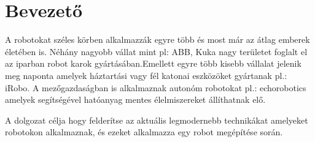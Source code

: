 \chapter{Bevezető}
A robotokat széles körben alkalmazzák egyre több és most már az átlag emberek életében is. Néhány nagyobb vállat mint pl: ABB, Kuka nagy területet foglalt el az iparban robot karok gyártásában.Emellett egyre több kisebb vállalat jelenik meg naponta amelyek háztartási vagy fél katonai eszközöket gyártanak pl.: iRobo. A mezőgazdaságban is alkalmaznak autonóm robotokat pl.: echorobotics amelyek segítségével hatóanyag mentes élelmiszereket állíthatnak elő.

A dolgozat célja hogy felderítse az aktuális legmodernebb technikákat amelyeket robotokon alkalmaznak, és ezeket alkalmazza egy robot megépítése során.

